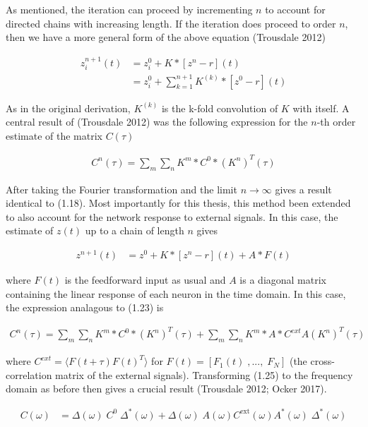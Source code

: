 \documentclass{ucetd}
\begin{document}
As mentioned, the iteration can proceed by incrementing $n$ to account for directed chains with increasing length. If the iteration does proceed to order $n$, then we have a more general form of the above equation (Trousdale 2012)

\begin{align}
z_{i}^{n+1}(t) &= z_{i}^{0} + K*[z^{n}-r](t)\\
&= z_{i}^{0} + \sum_{k=1}^{n+1} K^{(k)} *[z^{0}-r](t)
\end{align} 

As in the original derivation, $K^{(k)}$ is the k-fold convolution of $K$ with itself. A central result of (Trousdale 2012) was the following expression for the $n$-th order estimate of the matrix $C(\tau)$ 

\begin{align}
C^{n}(\tau) = \sum_{m}\sum_{n} K^{m}*C^{0}*(K^{n})^{T}(\tau)
\end{align} 

After taking the Fourier transformation and the limit $n\rightarrow\infty$ gives a result identical to (1.18). Most importantly for this thesis, this method been extended to also account for the network response to external signals. In this case, the estimate of $z(t)$ up to a chain of length $n$ gives

\begin{align}
z^{n+1}(t) &= z^{0} + K*[z^{n}-r](t) + A*F(t)
\end{align} 

where $F(t)$ is the feedforward input as usual and $A$ is a diagonal matrix containing the linear response of each neuron in the time domain. In this case, the expression analagous to (1.23) is 

\begin{align}
C^{n}(\tau) = \sum_{m}\sum_{n} K^{m}*C^{0}*(K^{n})^{T}(\tau) + \sum_{m}\sum_{n} K^{m}*A*C^{ext}A(K^{n})^{T}(\tau)
\end{align} 

where $C^{ext} = \langle F(t+\tau)F(t)^{T}\rangle$ for $F(t) = [F_{1}(t)\;,...,\;F_{N}]$ (the cross-correlation matrix of the external signals). Transforming (1.25) to the frequency domain as before then gives a crucial result (Trousdale 2012; Ocker 2017). 


\begin{align}
C(\omega) &= \Delta(\omega)\;C^{0}\;\Delta^{*}(\omega) + \Delta(\omega)\;A(\omega)C^{\mathrm{ext}}(\omega)A^{*}(\omega)\;\Delta^{*}(\omega)
\end{align} 
\end{document}
